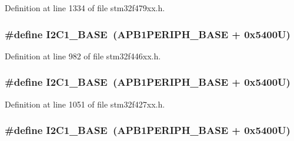 Definition at line 1334 of file stm32f479xx.\+h.

\subsubsection[{\texorpdfstring{I2\+C1\+\_\+\+B\+A\+SE}{I2C1_BASE}}]{\setlength{\rightskip}{0pt plus 5cm}\#define I2\+C1\+\_\+\+B\+A\+SE~({\bf A\+P\+B1\+P\+E\+R\+I\+P\+H\+\_\+\+B\+A\+SE} + 0x5400\+U)}\hypertarget{group___peripheral__memory__map_gacd72dbffb1738ca87c838545c4eb85a3}{}\label{group___peripheral__memory__map_gacd72dbffb1738ca87c838545c4eb85a3}


Definition at line 982 of file stm32f446xx.\+h.

\subsubsection[{\texorpdfstring{I2\+C1\+\_\+\+B\+A\+SE}{I2C1_BASE}}]{\setlength{\rightskip}{0pt plus 5cm}\#define I2\+C1\+\_\+\+B\+A\+SE~({\bf A\+P\+B1\+P\+E\+R\+I\+P\+H\+\_\+\+B\+A\+SE} + 0x5400\+U)}\hypertarget{group___peripheral__memory__map_gacd72dbffb1738ca87c838545c4eb85a3}{}\label{group___peripheral__memory__map_gacd72dbffb1738ca87c838545c4eb85a3}


Definition at line 1051 of file stm32f427xx.\+h.

\subsubsection[{\texorpdfstring{I2\+C1\+\_\+\+B\+A\+SE}{I2C1_BASE}}]{\setlength{\rightskip}{0pt plus 5cm}\#define I2\+C1\+\_\+\+B\+A\+SE~({\bf A\+P\+B1\+P\+E\+R\+I\+P\+H\+\_\+\+B\+A\+SE} + 0x5400\+U)}\hypertarget{group___peripheral__memory__map_gacd72dbffb1738ca87c838545c4eb85a3}{}\label{group___peripheral__memory__map_gacd72dbffb1738ca87c838545c4eb85a3}


